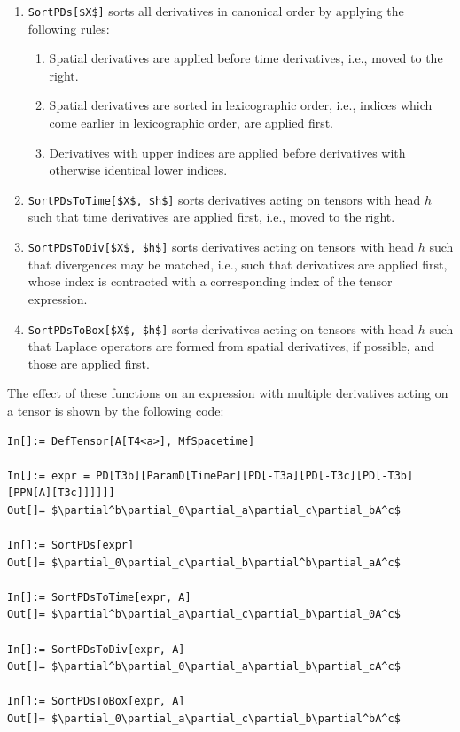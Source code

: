 \documentclass[notitlepage,a4paper,aps,prd,onecolumn,superscriptaddress,nofootinbib,groupedaddress,longbibliography]{revtex4-1}
\begin{document}
\begin{enumerate}
\item
\lstinline/SortPDs[$X$]/ sorts all derivatives in canonical order by applying the following rules:
\begin{enumerate}
\item
Spatial derivatives are applied before time derivatives, i.e., moved to the right.
\item
Spatial derivatives are sorted in lexicographic order, i.e., indices which come earlier in lexicographic order, are applied first.
\item
Derivatives with upper indices are applied before derivatives with otherwise identical lower indices.
\end{enumerate}

\item
\lstinline/SortPDsToTime[$X$, $h$]/ sorts derivatives acting on tensors with head \(h\) such that time derivatives are applied first, i.e., moved to the right.

\item
\lstinline/SortPDsToDiv[$X$, $h$]/ sorts derivatives acting on tensors with head \(h\) such that divergences may be matched, i.e., such that derivatives are applied first, whose index is contracted with a corresponding index of the tensor expression.

\item
\lstinline/SortPDsToBox[$X$, $h$]/ sorts derivatives acting on tensors with head \(h\) such that Laplace operators are formed from spatial derivatives, if possible, and those are applied first.
\end{enumerate}

The effect of these functions on an expression with multiple derivatives acting on a tensor is shown by the following code:

\begin{lstlisting}
In[]:= DefTensor[A[T4<a>], MfSpacetime]

In[]:= expr = PD[T3b][ParamD[TimePar][PD[-T3a][PD[-T3c][PD[-T3b][PPN[A][T3c]]]]]]
Out[]= $\partial^b\partial_0\partial_a\partial_c\partial_bA^c$

In[]:= SortPDs[expr]
Out[]= $\partial_0\partial_c\partial_b\partial^b\partial_aA^c$

In[]:= SortPDsToTime[expr, A]
Out[]= $\partial^b\partial_a\partial_c\partial_b\partial_0A^c$

In[]:= SortPDsToDiv[expr, A]
Out[]= $\partial^b\partial_0\partial_a\partial_b\partial_cA^c$

In[]:= SortPDsToBox[expr, A]
Out[]= $\partial_0\partial_a\partial_c\partial_b\partial^bA^c$
\end{lstlisting}
\end{document}
